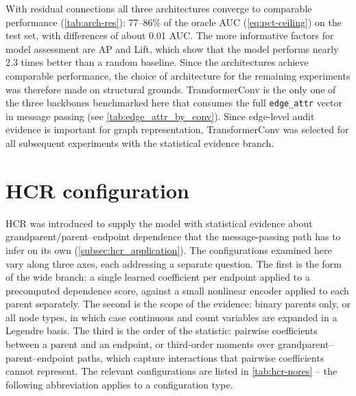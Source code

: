     With residual connections all three architectures converge to comparable
    performance (\cref{tab:arch-res}): 77--86\% of the oracle AUC
    (\cref{eq:pct-ceiling}) on the test
    set, with differences of about 0.01 AUC. The more informative factors for model assessment are AP and 
    Lift, which show that the model performs nearly 2.3 times better than a random baseline. 
    Since the architectures achieve comparable performance, the choice of architecture
    for 
    the remaining experiments 
    was therefore made on structural grounds. TransformerConv is the only one of the three
    backbones benchmarked here that consumes the full \texttt{edge\_attr} vector in message
    passing (see \cref{tab:edge_attr_by_conv}).
    Since edge-level audit evidence is important for graph representation, 
    TransformerConv was
    selected for all subsequent experiments with the statistical evidence branch.

\section{HCR configuration}

HCR was introduced to supply the model with statistical evidence about
grandparent/parent--endpoint dependence that the message-passing path has to infer on
its own (\cref{subsec:hcr_application}). The configurations examined here
vary along three axes, each addressing a separate question. The first is the
form of the wide branch: a single learned coefficient per endpoint applied
to a precomputed dependence score, against a small nonlinear encoder applied
to each parent separately. The second is the scope of the evidence: binary
parents only, or all node types, in which case continuous and count
variables are expanded in a Legendre basis. The third is the order of the
statistic: pairwise coefficients between a parent and an endpoint, or
third-order moments over grandparent--parent--endpoint paths, which capture
interactions that pairwise coefficients cannot represent. The relevant 
configurations are listed in \cref{tab:hcr-nores} -- the following abbreviation applies
to a configuration type.

